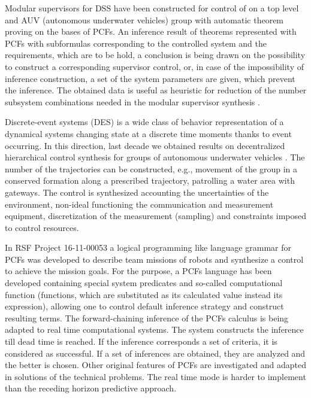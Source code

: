 \documentclass[conference]{IEEEtran}
\begin{document}
Modular supervisors for DSS have been constructed for control of on a top level and AUV (autonomous underwater vehicles) group with automatic theorem proving on the bases of PCFs. An inference result of theorems represented with PCFs with subformulas corresponding to the controlled system and the requirements, which are to be hold, a conclusion is being drawn on the possibility to construct a corresponding supervisor control, or, in case of the impossibility of inference construction, a set of the system parameters are given, which prevent the inference. The obtained data is useful as heuristic for reduction of the number subsystem combinations needed in the modular supervisor synthesis \cite{supdes,langdes}.

Discrete-event systems (DES) is a wide class of behavior representation of a dynamical systems changing state at a discrete time moments thanks to event occurring. In this direction, last decade we obtained results on decentralized hierarchical control synthesis for groups of autonomous underwater vehicles \cite{b4}. The number of the trajectories can be constructed, e.g., movement of the group in a conserved formation along a prescribed trajectory, patrolling a water area with gateways. The control is synthesized accounting the uncertainties of the environment, non-ideal functioning the communication and measurement equipment, discretization of the measurement (sampling) and constraints imposed to control resources.

In RSF Project 16-11-00053 a logical programming like language grammar for PCFs was developed to describe team missions of robots \cite{b5} and synthesize a control to achieve the mission goals. For the purpose, a PCFs language has been developed containing special system predicates and so-called computational function (functions, which are substituted as its calculated value instead its expression), allowing one to control default inference strategy and construct resulting terms. The forward-chaining inference of the PCFs calculus is being adapted to real time computational systems. The system constructs the inference till dead time is reached. If the inference corresponds a set of criteria, it is considered as successful. If a set of inferences are obtained, they are analyzed and the better is chosen. Other original features of PCFs are investigated and adapted in solutions of the technical problems. The real time mode is harder to implement than the receding horizon predictive approach.
\end{document}
